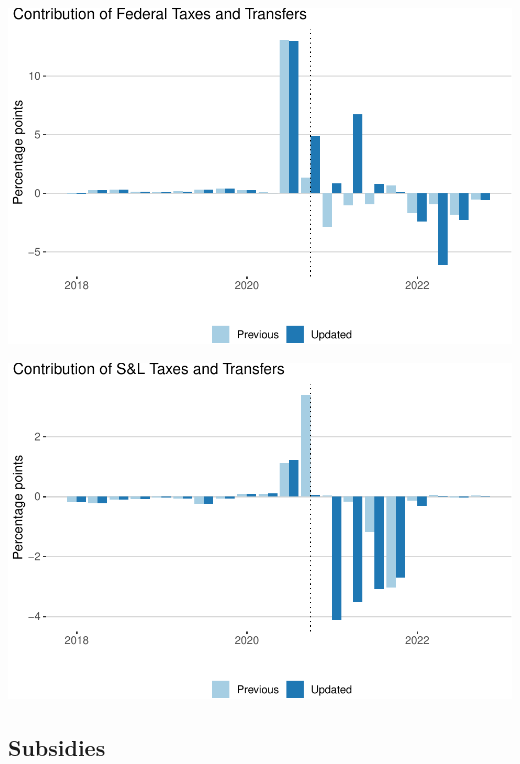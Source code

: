 \documentclass[
]{article}
\begin{document}
\begin{center}\includegraphics{compare-update_files/figure-latex/federal-tts-1} \end{center}

\begin{center}\includegraphics{compare-update_files/figure-latex/state-tts-1} \end{center}

\hypertarget{subsidies}{%
\subsection{Subsidies}\label{subsidies}}
\end{document}
